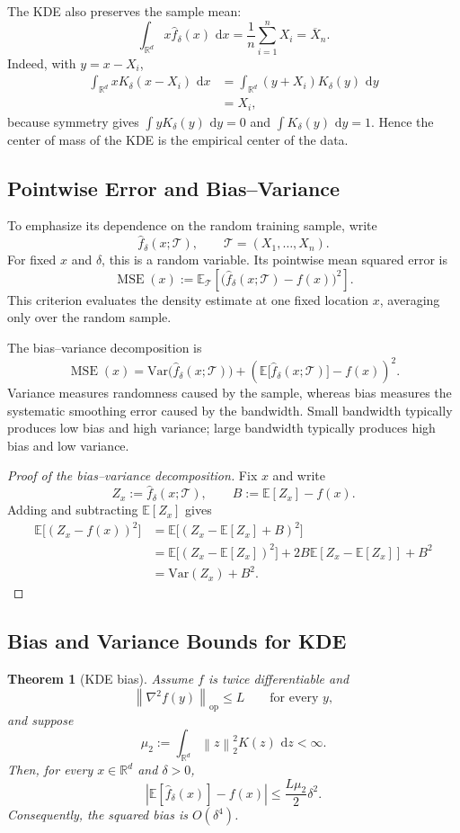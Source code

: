 \documentclass[12pt,oneside]{book}
\numberwithin{equation}{section}
\theoremstyle{definition}
\theoremstyle{plain}
\newtheorem{theorem}{Theorem}[section]
\theoremstyle{remark}
\newcommand{\R}{\mathbb{R}}
\newcommand{\E}{\mathbb{E}}
\newcommand{\Var}{\mathrm{Var}}
\newcommand{\norm}[1]{\left\lVert #1 \right\rVert}
\newcommand{\dd}{\,\mathrm{d}}
\begin{document}
The KDE also preserves the sample mean:
\[
\int_{\R^d}x\widehat f_\delta(x)\,\dd x
=\frac{1}{n}\sum_{i=1}^nX_i
=\overline X_n.
\]
Indeed, with $y=x-X_i$,
\begin{align*}
\int_{\R^d}xK_\delta(x-X_i)\,\dd x
&=\int_{\R^d}(y+X_i)K_\delta(y)\,\dd y\\
&=X_i,
\end{align*}
because symmetry gives $\int yK_\delta(y)\,\dd y=0$ and $\int K_\delta(y)\,\dd y=1$. Hence the center of mass of the KDE is the empirical center of the data.

\subsection{Pointwise Error and Bias--Variance}
To emphasize its dependence on the random training sample, write
\[
\widehat f_\delta(x;\mathcal{T}),
\qquad
\mathcal{T}=(X_1,\ldots,X_n).
\]
For fixed $x$ and $\delta$, this is a random variable. Its pointwise mean squared error is
\[
\operatorname{MSE}(x)
:=\E_{\mathcal{T}}
\left[\bigl(\widehat f_\delta(x;\mathcal{T})-f(x)\bigr)^2\right].
\]
This criterion evaluates the density estimate at one fixed location $x$, averaging only over the random sample.

The bias--variance decomposition is
\[
\operatorname{MSE}(x)
=\Var\bigl(\widehat f_\delta(x;\mathcal{T})\bigr)
+\left(\E\bigl[\widehat f_\delta(x;\mathcal{T})\bigr]-f(x)\right)^2.
\]
Variance measures randomness caused by the sample, whereas bias measures the systematic smoothing error caused by the bandwidth. Small bandwidth typically produces low bias and high variance; large bandwidth typically produces high bias and low variance.

\begin{proof}[Proof of the bias--variance decomposition]
Fix $x$ and write
\[
Z_x:=\widehat f_\delta(x;\mathcal{T}),
\qquad
B:=\E[Z_x]-f(x).
\]
Adding and subtracting $\E[Z_x]$ gives
\begin{align*}
\E\bigl[(Z_x-f(x))^2\bigr]
&=\E\bigl[(Z_x-\E[Z_x]+B)^2\bigr]\\
&=\E\bigl[(Z_x-\E[Z_x])^2\bigr]
+2B\E[Z_x-\E[Z_x]]+B^2\\
&=\Var(Z_x)+B^2.
\end{align*}
\end{proof}

\subsection{Bias and Variance Bounds for KDE}
\begin{theorem}[KDE bias]
Assume $f$ is twice differentiable and
\[
\norm{\nabla^2f(y)}_{\mathrm{op}}\leq L
\qquad\text{for every }y,
\]
and suppose
\[
\mu_2:=\int_{\R^d}\norm{z}_2^2K(z)\,\dd z<\infty.
\]
Then, for every $x\in\R^d$ and $\delta>0$,
\[
\left\lvert\E[\widehat f_\delta(x)]-f(x)\right\rvert
\leq\frac{L\mu_2}{2}\delta^2.
\]
Consequently, the squared bias is $O(\delta^4)$.
\end{theorem}
\end{document}
